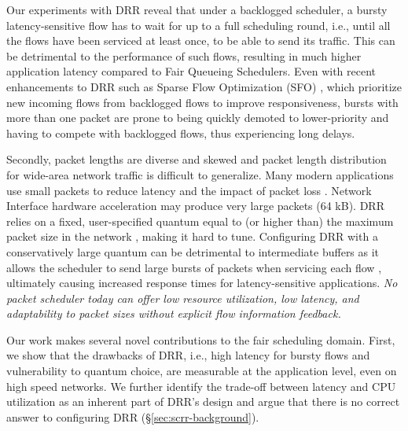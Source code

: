 Our experiments with DRR reveal that under
a backlogged scheduler, a bursty latency-sensitive flow has to wait
for up to a full scheduling round, i.e., until all the flows have been
serviced at least once, to be able to send its traffic. This can be
detrimental to the performance of such flows, resulting in much higher application latency compared to Fair Queueing Schedulers. 
Even with recent enhancements to DRR such as Sparse Flow Optimization (SFO) \cite{sfo}, which prioritize new incoming flows from backlogged flows to improve responsiveness, bursts with more than one packet are prone to being quickly demoted to lower-priority and having to compete with backlogged flows, thus experiencing long delays.

Secondly, packet lengths are diverse and skewed \cite{caida,
mawi,ccdc,wild,im,harmony} and packet length distribution for
wide-area network traffic is difficult to generalize. Many modern
applications use small packets to reduce latency and the impact of
packet loss \cite{webrtc-teams, zoom-quality}. Network Interface
hardware acceleration \cite{linux-gso-gro} may produce very large
packets (64 kB).
DRR relies on a fixed, user-specified quantum equal to (or higher
than) the maximum packet size in the network \cite{drr}, making it
hard to tune. Configuring DRR with a conservatively large quantum can
be detrimental to  intermediate buffers as it allows the scheduler
to send large bursts of packets when servicing each flow
\cite{strr,aliquem}, ultimately causing increased response times for
latency-sensitive applications.
\textit{No packet scheduler today can offer low resource utilization,
low latency, and adaptability to packet sizes without explicit flow information feedback.}

Our work makes several novel contributions to the fair scheduling domain.
First, we show that the drawbacks of DRR, i.e., high latency for bursty flows and
vulnerability to quantum choice, are measurable at the application
level, even on high speed networks. We further identify the
trade-off between latency and CPU utilization as an inherent part of
DRR's design and argue that there is no correct answer to configuring
DRR (\S\ref{sec:scrr-background}).

